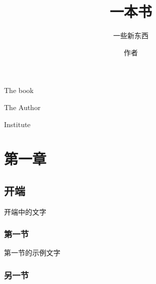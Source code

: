 \documentclass[fontsize=11pt, paper=a5, pagesize=auto]{scrbook}
\begin{document}
\title{一本书}
\subtitle{一些新东西}
\author{作者}
\date{}
\tableofcontents
\begin{titlepage}
	\vspace*{1cm}
	{\huge\raggedright The book\par}
	\noindent\hrulefill\par
	{\LARGE\raggedleft The Author\par}
	\vfill
	{\Large\raggedleft Institute\par}
\end{titlepage}
\part{第一章}
\chapter{开端}
开端中的文字
\section{第一节}
第一节的示例文字
\blindtext
\section{另一节}
\Blindtext
\end{document}
